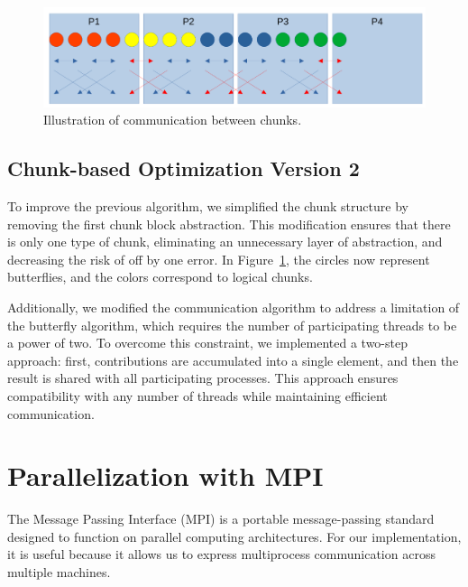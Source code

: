 \documentclass[10pt]{article}
\begin{document}
\begin{multicols}{2}
\begin{figure}[H]
  \includegraphics[scale=0.21]{img/chunks.png}
  \centering
  \caption{Illustration of communication between chunks.}
  \label{fig:chunks}
\end{figure}

\subsection*{Chunk-based Optimization Version 2}

To improve the previous algorithm, we simplified the chunk structure by removing the first chunk block abstraction.
This modification ensures that there is only one type of chunk, eliminating an unnecessary layer of abstraction, and decreasing the risk of off by one error.
In Figure~\ref{fig:chunks}, the circles now represent butterflies, and the colors correspond to logical chunks.

Additionally, we modified the communication algorithm to address a limitation of the butterfly algorithm, which requires the number of participating threads to be a power of two.
To overcome this constraint, we implemented a two-step approach: first, contributions are accumulated into a single element, and then the result is shared with all participating processes.
This approach ensures compatibility with any number of threads while maintaining efficient communication.





\section{Parallelization with MPI}

The Message Passing Interface (MPI) is a portable message-passing standard designed to function on parallel computing architectures.
For our implementation, it is useful because it allows us to express multiprocess communication across multiple machines.


\end{multicols}
\end{document}
